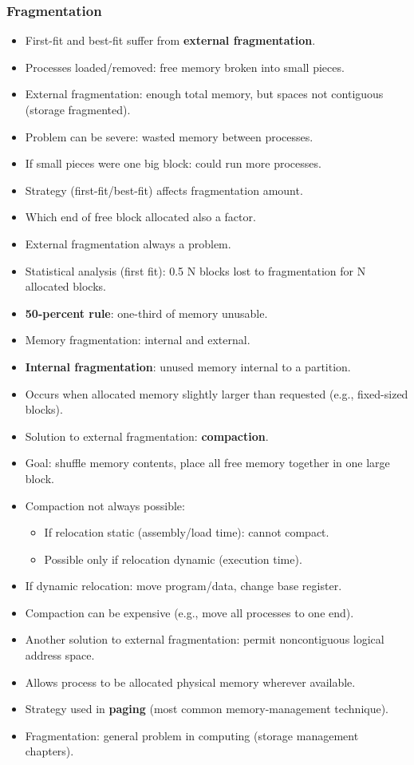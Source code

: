 \subsubsection*{Fragmentation}
\begin{itemize}
    \item First-fit and best-fit suffer from \textbf{external fragmentation}.
    \item Processes loaded/removed: free memory broken into small pieces.
    \item External fragmentation: enough total memory, but spaces not contiguous (storage fragmented).
    \item Problem can be severe: wasted memory between processes.
    \item If small pieces were one big block: could run more processes.
    \item Strategy (first-fit/best-fit) affects fragmentation amount.
    \item Which end of free block allocated also a factor.
    \item External fragmentation always a problem.
    \item Statistical analysis (first fit): 0.5 N blocks lost to fragmentation for N allocated blocks.
    \item \textbf{50-percent rule}: one-third of memory unusable.
    \item Memory fragmentation: internal and external.
    \item \textbf{Internal fragmentation}: unused memory internal to a partition.
    \item Occurs when allocated memory slightly larger than requested (e.g., fixed-sized blocks).
    \item Solution to external fragmentation: \textbf{compaction}.
    \item Goal: shuffle memory contents, place all free memory together in one large block.
    \item Compaction not always possible:
    \begin{itemize}
        \item If relocation static (assembly/load time): cannot compact.
        \item Possible only if relocation dynamic (execution time).
    \end{itemize}
    \item If dynamic relocation: move program/data, change base register.
    \item Compaction can be expensive (e.g., move all processes to one end).
    \item Another solution to external fragmentation: permit noncontiguous logical address space.
    \item Allows process to be allocated physical memory wherever available.
    \item Strategy used in \textbf{paging} (most common memory-management technique).
    \item Fragmentation: general problem in computing (storage management chapters).
\end{itemize}

